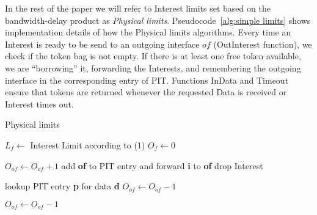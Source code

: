 In the rest of the paper we will refer to Interest limits set based on the bandwidth-delay product as \emph{Physical limits}.
Pseudocode~\ref{alg:simple limits} shows implementation details of how the Physical limits algorithms.
Every time an Interest is ready to be send to an outgoing interface $of$ (OutInterest function), we check if the token bag is not empty.
If there is at least one free token available, we are ``borrowing'' it, forwarding the Interests, and remembering the outgoing interface in the corresponding entry of PIT.
Functions InData and Timeout ensure that tokens are returned whenever the requested Data is received or Interest times out.


\begin{algorithm}[h]
\caption{Physical limits}
\label{alg:simple limits}
\begin{algorithmic}[1]
    \State $L_{f} \leftarrow$ Interest Limit according to (1)
    \State $O_{f} \leftarrow 0$ 
\EndFor

\vspace{0.2cm}
     
        \State $O_{of} \leftarrow O_{of} + 1$  
        \State add \textbf{of} to PIT entry and forward \textbf{i} to \textbf{of}
    \Else
        \State drop Interest
    \EndIf
\EndFunction

\vspace{0.2cm}

   \State lookup PIT entry \textbf{p} for data \textbf{d}
        \State $O_{of} \leftarrow O_{of} - 1$ 
   \EndFor
\EndFunction

\vspace{0.2cm}

        \State $O_{of} \leftarrow O_{of} - 1$ 
   \EndFor
\EndFunction

\end{algorithmic}
\end{algorithm}



